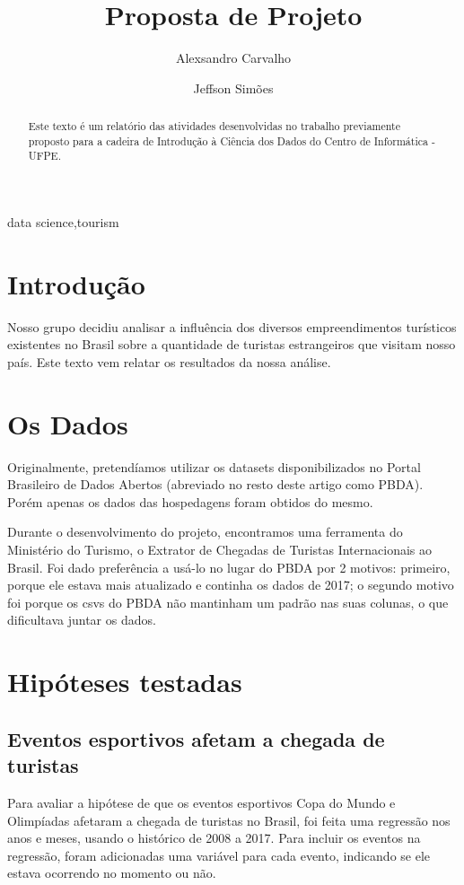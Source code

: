 \documentclass[review]{elsarticle}
\begin{document}
\begin{frontmatter}

\title{Proposta de Projeto}

\author{Alexsandro Carvalho}

\author{Jeffson Simões}

\begin{abstract}
Este texto é um relatório das atividades desenvolvidas no trabalho previamente proposto para a cadeira de Introdução à Ciência dos Dados do Centro de Informática - UFPE.
\end{abstract}

\begin{keyword}
data science\sep tourism
\end{keyword}

\end{frontmatter}

\linenumbers

\section{Introdução}
Nosso grupo decidiu analisar a influência dos diversos empreendimentos turísticos existentes no Brasil sobre a quantidade de turistas estrangeiros que visitam nosso país. Este texto vem relatar os resultados da nossa análise.

\section{Os Dados}
Originalmente, pretendíamos utilizar os datasets disponibilizados no Portal Brasileiro de Dados Abertos (abreviado no resto deste artigo como PBDA). Porém apenas os dados das hospedagens foram obtidos do mesmo.

Durante o desenvolvimento do projeto, encontramos uma ferramenta do Ministério do Turismo, o Extrator de Chegadas de Turistas Internacionais ao Brasil. Foi dado preferência a usá-lo no lugar do PBDA por 2 motivos: primeiro, porque ele estava mais atualizado e continha os dados de 2017; o segundo motivo foi porque os csvs do PBDA não mantinham um padrão nas suas colunas, o que dificultava juntar os dados.

\section{Hipóteses testadas}
\subsection{Eventos esportivos afetam a chegada de turistas}
Para avaliar a hipótese de que os eventos esportivos Copa do Mundo e Olimpíadas afetaram a chegada de turistas no Brasil, foi feita uma regressão nos anos e meses, usando o histórico de 2008 a 2017. Para incluir os eventos na regressão, foram adicionadas uma variável para cada evento, indicando se ele estava ocorrendo no momento ou não.
\end{document}
